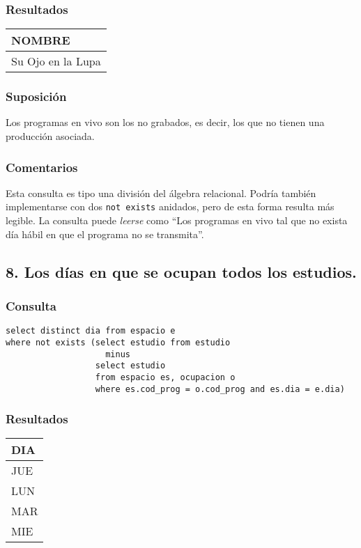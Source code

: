 \subsubsection*{Resultados}
\begin{tabular}{|l|}
  \hline
    \bf{NOMBRE} \\ 
  \hline
    Su Ojo en la Lupa \\ 
  \hline
\end{tabular} 

\subsubsection*{Suposici\'on}
Los programas en vivo son los no grabados, es decir, los que no tienen una producción asociada.

\subsubsection*{Comentarios}
Esta consulta es tipo una división del álgebra relacional. Podría también implementarse con dos \lstinline|not exists| anidados, pero de esta forma resulta más legible. La consulta puede \textit{leerse} como ``Los programas en vivo tal que no exista día hábil en que el programa no se transmita''.

\subsection*{8. \normalsize{Los d\'ias en que se ocupan todos los estudios.}}

\subsubsection*{Consulta}
\begin{lstlisting} 
select distinct dia from espacio e
where not exists (select estudio from estudio
                    minus
                  select estudio 
                  from espacio es, ocupacion o
                  where es.cod_prog = o.cod_prog and es.dia = e.dia)
\end{lstlisting}

\subsubsection*{Resultados}
\begin{tabular}{|l|}
  \hline
    \bf{DIA} \\ 
  \hline
    JUE \\
    LUN \\
    MAR \\
    MIE \\
  \hline
\end{tabular} 

